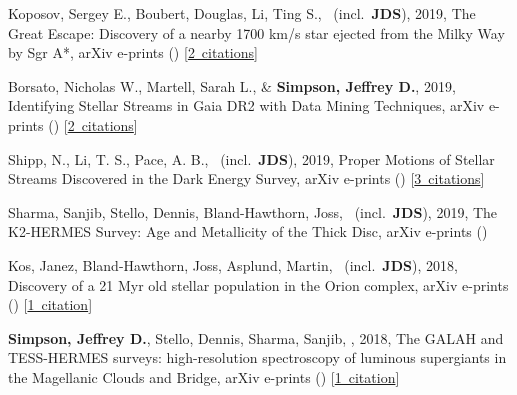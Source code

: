 \item[{\color{numcolor}\scriptsize6}] Koposov, Sergey E., Boubert, Douglas, Li, Ting S., \etal\ (incl.\ \textbf{JDS}), 2019, The Great Escape: Discovery of a nearby 1700 km/s star ejected from the Milky Way by Sgr A*, arXiv e-prints () [\href{https://ui.adsabs.harvard.edu/#abs/2019arXiv190711725K}{2~citations}]

\item[{\color{numcolor}\scriptsize5}] Borsato, Nicholas W., Martell, Sarah L., \& \textbf{Simpson, Jeffrey D.}, 2019, Identifying Stellar Streams in Gaia DR2 with Data Mining Techniques, arXiv e-prints () [\href{https://ui.adsabs.harvard.edu/#abs/2019arXiv190702527B}{2~citations}]

\item[{\color{numcolor}\scriptsize4}] Shipp, N., Li, T. S., Pace, A. B., \etal\ (incl.\ \textbf{JDS}), 2019, Proper Motions of Stellar Streams Discovered in the Dark Energy Survey, arXiv e-prints () [\href{https://ui.adsabs.harvard.edu/#abs/2019arXiv190709488S}{3~citations}]

\item[{\color{numcolor}\scriptsize3}] Sharma, Sanjib, Stello, Dennis, Bland-Hawthorn, Joss, \etal\ (incl.\ \textbf{JDS}), 2019, The K2-HERMES Survey: Age and Metallicity of the Thick Disc, arXiv e-prints ()

\item[{\color{numcolor}\scriptsize2}] Kos, Janez, Bland-Hawthorn, Joss, Asplund, Martin, \etal\ (incl.\ \textbf{JDS}), 2018, Discovery of a 21 Myr old stellar population in the Orion complex, arXiv e-prints () [\href{https://ui.adsabs.harvard.edu/#abs/2018arXiv181111762K}{1~citation}]

\item[{\color{numcolor}\scriptsize1}] \textbf{Simpson, Jeffrey D.}, Stello, Dennis, Sharma, Sanjib, \etal, 2018, The GALAH and TESS-HERMES surveys: high-resolution spectroscopy of luminous supergiants in the Magellanic Clouds and Bridge, arXiv e-prints () [\href{https://ui.adsabs.harvard.edu/#abs/2018arXiv180405900S}{1~citation}]